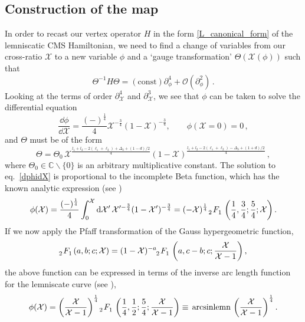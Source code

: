 \documentclass{article}
\def \ds {\partial}
\def \Cs {\mathbb{C}}
\def \oo {\mathcal{O}}
\begin{document}
\subsection{Construction of the map}
In order to recast our vertex operator $H$ in the form \eqref{L_canonical_form} of the lemniscatic CMS Hamiltonian, we need 
to find a change of variables from our cross-ratio $\mathcal{X}$ to a new 
variable $\phi$ and a `gauge transformation' $\Theta(\mathcal{X}(\phi))$ such that 
\begin{equation}
     \Theta^{-1} H \Theta = (\mathrm{const}) \ds_{\phi}^4 + \oo (\ds_{\phi}^2)\,. 
\end{equation}
Looking at the terms of order $\ds_{\mathcal{X}}^4$ and $\ds_{\mathcal{X}}^3$, we see that $\phi$ can be taken to solve 
the differential equation 
\begin{equation}
\frac{\dd \phi}{\dd \mathcal{X}} = \frac{(-)^{\frac{1}{4}}}{4} \mathcal{X}^{-\frac{3}{4}} (1-\mathcal{X})^{-\frac{3}{4}}, \qquad \phi(\mathcal{X}=0) = 0\,,
\label{dphidX}
\end{equation}
and $\Theta$ must be of the form
\begin{equation}
    \Theta = \Theta_0 \, \mathcal{X}^{\frac{l_1+l_2-2(\ell_1+\ell_2) + \Delta_3 + (1-d)/2}{4}} (1-\mathcal{X})^{\frac{l_1+l_2-2(\ell_1+\ell_2)-\Delta_3+(1+d)/2}{4}}\,,
\end{equation}
where $\Theta_0 \in \Cs\backslash \{0\}$ is an arbitrary multiplicative constant.
The solution to eq.\ \eqref{dphidX} is proportional to the incomplete Beta function, which has the known analytic expression (see \cite[Eq.~8.17.7]{dlmf})
\begin{equation}
\phi(\mathcal{X}) =\frac{(-)^{\frac{1}{4}}}{4} \int_0^{\mathcal{X}} \dd \mathcal{X}' \, \mathcal{X}'^{-\frac{3}{4}} (1-\mathcal{X}')^{-\frac{3}{4}} = (-\mathcal{X})^{\frac{1}{4}} \, \tensor[_2]{F}{_1}\left(\frac{1}{4}, \frac{3}{4}; \frac{5}{4}; \mathcal{X} \right).
\end{equation}
If we now apply the Pfaff transformation of the Gauss hypergeometric function, 
\begin{equation}
\tensor[_2]{F}{_1}(a,b;c;\mathcal{X}) = (1-\mathcal{X})^{-a} \tensor[_2]{F}{_1}\left(a,c-b;c; \frac{\mathcal{X}}{\mathcal{X}-1} \right),
\end{equation}
the above function can be expressed in terms of the inverse arc length function for the lemniscate curve (see \cite[Eq.~5]{lemniscate}),
\begin{equation}
\phi(\mathcal{X}) = \left( \frac{\mathcal{X}}{\mathcal{X}-1} \right)^{\frac{1}{4}} \tensor[_2]{F}{_1}\left(\frac{1}{4}, \frac{1}{2}; \frac{5}{4};  \frac{\mathcal{X}}{\mathcal{X}-1}\right) \equiv \, \mathrm{arcsinlemn} \, \left( \frac{\mathcal{X}}{\mathcal{X}-1} \right)^{\frac{1}{4}}.
\label{arcsinlemn}
\end{equation}
\end{document}
